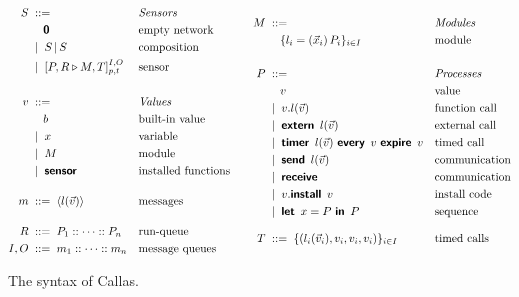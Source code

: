\documentclass[copyright,creativecommons]{eptcs}
\newcommand{\keyw}[1]{\textbf{\textsf{#1}}\,}
\newcommand{\inaction}{\textbf{\textsf{0}}}
\newcommand{\installk}{\keyw{install}}
\newcommand{\ink}{\keyw{in}}
\newcommand{\systemk}{\keyw{extern}}
\newcommand{\letk}{\keyw{let}}
\newcommand{\sendk}{\keyw{send}}
\newcommand{\firek}{\keyw{timer}}
\newcommand{\everyk}{\keyw{every}}
\newcommand{\expirek}{\keyw{expire}}
\newcommand{\receivek}{\keyw{receive}}
\newcommand{\branek}{\keyw{sensor}}
\newcommand{\sensor}[6]{[{#1} \triangleright {#2}]^{{#3}, {#4}}_{{#5}, {#6}}}
\newcommand{\amoduled}{\{ {l_i} = {\abstr {\vec x_i}{P_i}}\}_{i\in I}}
\newcommand{\abstr}[2]{({#1})\,{#2}}
\newcommand{\invk}[3]{{#1}.{#2}({#3})}
\newcommand{\invkd}{\invk {v}{l}{\vec v}}
\newcommand{\system}[1]{\systemk\ {#1}}
\newcommand{\systemd}{\system {\msgd}}
\newcommand{\fire}[3]{\firek\ {#1}\ \everyk\ {#2}\ \expirek\ {#3}}
\newcommand{\fired}{\fire {\msgd} v v}
\newcommand{\send}[1]{\sendk\ {#1}}
\newcommand{\sendd}{\send {\msgd}}
\newcommand{\msg}[2]{{#1}({#2})}
\newcommand{\msgd}{\msg l {\vec v}}
\newcommand{\receivedd}{\receivek}
\newcommand{\install}[2]{{#1}.\installk\ {#2}}
\newcommand{\installd}{\install v v}
\newcommand{\Let}[3]{\letk\ {#1} = {#2}\ \ink\ {#3}}
\newcommand{\Letd}{\Let x P P}
\newcommand{\parn}{\,\vert\,}
\newcommand{\pad}{\;\;}
\newcommand{\Space}[1]{\pad{#1}\pad}
\newcommand{\grmeq}{\Space{::=}}
\newcommand{\grmor}{\;\mid\;}
\begin{document}
\begin{figure}
\begin{equation*}
    \begin{aligned}
      S & \grmeq                          & & \text{\emph{Sensors}}\\
        & \quad \; \inaction           & & \text{empty network}\\
        & \grmor S \parn S                & & \text{composition}\\
        & \grmor \sensor {P,R} {M,T} I O p t  & & \text{sensor}\\[0.5cm]
v & \grmeq                          & & \text{\emph{Values}}\\
        & \quad \; b                   & & \text{built-in value}\\
        & \grmor x                        & & \text{variable}\\
        & \grmor M                        & & \text{module}\\
        & \grmor \branek                  & & \text{installed functions}\\[0.4cm]
m & \grmeq \langle l(\vec v)\rangle     & & \text{messages}\\[0.4cm]
R & \grmeq P_1::\dots::P_n  & & \text{run-queue} \\
      I,O & \grmeq m_1::\dots::m_n        & & \text{message queues} 
    \end{aligned}
    \qquad
    \begin{aligned}
      M & \grmeq              & & \text{\emph{Modules}}\\                
        & \quad \; \amoduled  & & \text{module}\\[0.5cm]
P & \grmeq              & & \text{\emph{Processes}}\\
        & \quad \; v       & & \text{value}\\
        & \grmor \invkd       & & \text{function call}\\
        & \grmor \systemd     & & \text{external call}\\
        & \grmor \fired       & & \text{timed call}\\
        & \grmor \sendd       & & \text{communication}\\
        & \grmor \receivedd   & & \text{communication}\\
        & \grmor \installd    & & \text{install code}\\
        & \grmor \Letd        & & \text{sequence}\\[0.3cm]
T & \grmeq \{(l_i(\vec v_i),v_i,v_i,v_i)\}_{i \in I} & & \text{timed calls} 
\end{aligned}
  \end{equation*}
\caption{The syntax of Callas.}
\label{fig:syntax}
\end{figure}
\end{document}
